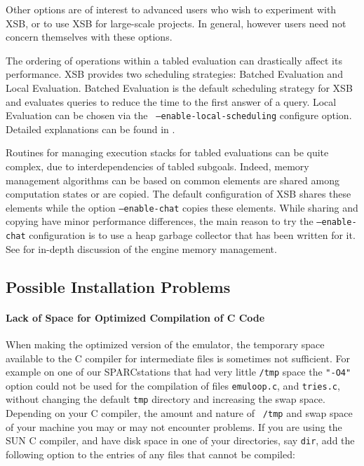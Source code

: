 Other options are of interest to advanced users who wish to experiment
with XSB, or to use XSB for large-scale projects.  In general, however
users need not concern themselves with these options.

\begin{description}
\item[Type of Scheduling Strategy.]  The ordering of operations within
a tabled evaluation can drastically affect its performance.  XSB
provides two scheduling strategies: Batched Evaluation and Local
Evaluation.  Batched Evaluation is the default scheduling strategy for
XSB and evaluates queries to reduce the time to the first answer of a
query.  Local Evaluation can be chosen via the {\tt
--enable-local-scheduling} configure option.  Detailed explanations
can be found in \cite{JFLP-Scheduling}.
%
\item[Type of Memory Management.]  Routines for managing execution
stacks for tabled evaluations can be quite complex, due to
interdependencies of tabled subgoals.  Indeed, memory management
algorithms can be based on common elements are shared among
computation states or are copied.  The default configuration of XSB
shares these elements while the option {\tt --enable-chat} copies
these elements.  While sharing and copying have minor performance
differences, the main reason to try the {\tt --enable-chat}
configuration is to use a heap garbage collector that has been written
for it.  See \cite{SaSw98,CAT@PLILP-98,CATmem@ISMM-98,CHAT@PADL-99}
for in-depth discussion of the engine memory management.
\end{description}

\subsection{Possible Installation Problems}

\paragraph*{Lack of Space for Optimized Compilation of C Code}
When making the optimized version of the emulator, the temporary space
available to the C compiler for intermediate files is sometimes not
sufficient. For example on one of our SPARCstations that had very
little {\tt /tmp} space the {\tt "-O4"} option could not be used for
the compilation of files {\tt emuloop.c}, and {\tt tries.c}, without
changing the default {\tt tmp} directory and increasing the swap
space.  Depending on your C compiler, the amount and nature of {\tt
/tmp} and swap space of your machine you may or may not encounter
problems.  If you are using the SUN C compiler, and have disk space in
one of your directories, say {\tt dir}, add the following option to
the entries of any files that cannot be compiled:

